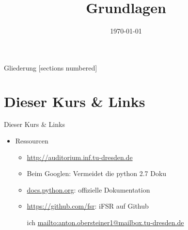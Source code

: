 



\title{Grundlagen}
\date{\today}




\maketitle

\begin{frame}{Gliederung}
	[sections numbered]
	\tableofcontents
\end{frame}

\section{Dieser Kurs \& Links}
\begin{frame}{Dieser Kurs \& Links}
	\begin{itemize}
		\item Ressourcen
		\begin{itemize}
			\item \url{http://auditorium.inf.tu-dresden.de}
			\item Beim Googlen: Vermeidet die python 2.7 Doku
			\item \url{docs.python.org}: offizielle Dokumentation
			\item \url{https://github.com/fsr}: iFSR auf Github
			\item[ich] \url{mailto:anton.obersteiner1@mailbox.tu-dresden.de}
		\end{itemize}
	\end{itemize}
\end{frame}


